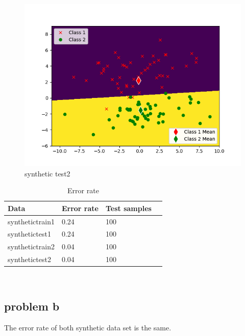 \documentclass{article}
\begin{document}
	\begin{figure}[hbt!]
		\includegraphics[width=\linewidth]{images/synthetic_test2.png}
		\caption{synthetic test2}
		\label{fig:synthetictest2}
	\end{figure}
		\begin{table}[hbt!]
		\begin{center}
		\begin{tabular}{| l | l | l | p{5cm} |}
		\hline
			Data      & Error rate & Test samples  \\ \hline
			synthetictrain1& 0.24        & 100    \\  \hline
			synthetictest1& 0.24		& 100    \\   \hline
			synthetictrain2& 0.04        & 100    \\  \hline
			synthetictest2& 0.04		& 100    \\   \hline
		\end{tabular}
		\end{center}
	\caption{Error rate}
	\label{table: errorrate}
	\end{table}
	 \\
	\subsection{problem b}
The error rate of both synthetic data set is the same. 
\end{document}
